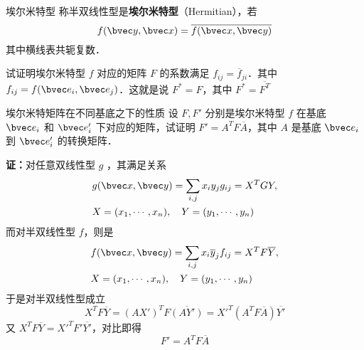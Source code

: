 
\begin{definition}{埃尔米特型}
称半双线性型是\textbf{埃尔米特型}（Hermitian），若
\begin{equation}\label{HeFor_eq2}
f(\bvec y,\bvec x)=\overline{f(\bvec x,\bvec y)}
\end{equation}
其中横线表共轭复数．
\end{definition}
\begin{example}{}
试证明埃尔米特型 $f$ 对应的矩阵 $F$ 的系数满足 $f_{ij}=\overline f_{ji}$．其中 $f_{ij}=f(\bvec e_i,\bvec e_j)$．这就是说 $F^*=F$，其中 $F^*=\overline {F^T}$
\end{example}
\begin{example}{埃尔米特矩阵在不同基底之下的性质}
设 $F,F'$ 分别是埃尔米特型 $f$ 在基底 $\bvec e_i$ 和 $\bvec e'_i$ 下对应的矩阵，试证明 $F'=A^TF\overline A$，其中 $A$ 是基底 $\bvec e_i$ 到 $\bvec e'_i$ 的转换矩阵．

\textbf{证：}对任意双线性型 $g$ ，其满足关系
\begin{equation}
\begin{aligned}
&g(\bvec x,\bvec y)=\sum_{i,j}x_i y_j g_{ij}=X^TGY,\\
&X=(x_1,\cdots,x_n),\quad Y=(y_1,\cdots,y_n)
\end{aligned}
\end{equation}
而对半双线性型 $f$，则是
\begin{equation}\label{HeFor_eq1}
\begin{aligned}
&f(\bvec x,\bvec y)=\sum_{i,j}x_i \overline y_j f_{ij}=X^TF\overline Y,\\
&X=(x_1,\cdots,x_n),\quad Y=(y_1,\cdots,y_n)
\end{aligned}
\end{equation}
于是对半双线性型成立
\begin{equation}
X^TF\overline{Y}=(AX')^TF\overline{(AY')}={X'}^T(A^TF\overline A)\overline{Y'}
\end{equation}
又 $X^T F\overline Y=X'^TF'\overline{Y'}$，对比即得
\begin{equation}
F'=A^TF\overline A
\end{equation}
\end{example}